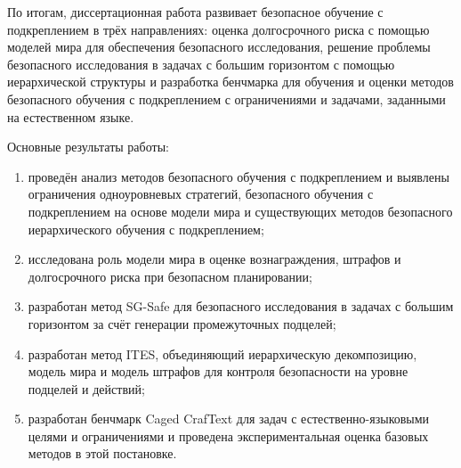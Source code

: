 По итогам, диссертационная работа развивает безопасное обучение с подкреплением в трёх направлениях: оценка долгосрочного риска с помощью моделей мира для обеспечения безопасного исследования, решение проблемы безопасного исследования в задачах с большим горизонтом с помощью иерархической структуры и разработка бенчмарка для обучения и оценки методов безопасного обучения с подкреплением с ограничениями и задачами, заданными на естественном языке.

Основные результаты работы:
\begin{enumerate}
  \item проведён анализ методов безопасного обучения с подкреплением и выявлены ограничения одноуровневых стратегий, безопасного обучения с подкреплением на основе модели мира и существующих методов безопасного иерархического обучения с подкреплением;
  \item исследована роль модели мира в оценке вознаграждения, штрафов и долгосрочного риска при безопасном планировании;
  \item разработан метод SG-Safe для безопасного исследования в задачах с большим горизонтом за счёт генерации промежуточных подцелей;
  \item разработан метод ITES, объединяющий иерархическую декомпозицию, модель мира и модель штрафов для контроля безопасности на уровне подцелей и действий;
  \item разработан бенчмарк Caged CrafText для задач с естественно-языковыми целями и ограничениями и проведена экспериментальная оценка базовых методов в этой постановке.
\end{enumerate}

